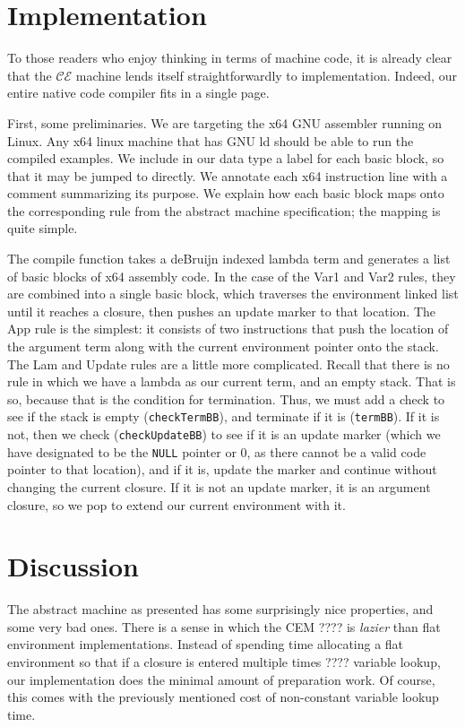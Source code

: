 \documentclass[preprint]{sigplanconf}
\begin{document}
\section{Implementation}\label{sec:impl}

To those readers who enjoy thinking in terms of machine code, it is
already clear that the $\mathcal{CE}$ machine lends itself
straightforwardly to implementation. Indeed, our
entire native code compiler fits in a single page. 

First, some preliminaries. We are targeting the x64 GNU
assembler running on Linux. Any x64 linux machine that has GNU ld should be able
to run the compiled examples.
We include in our
data type a label for each basic block, so that it may be jumped to directly.
We annotate each x64 instruction line with a comment summarizing its purpose. 
We explain how each basic block maps onto the corresponding rule from
the abstract machine specification; the mapping is
quite simple. 

The compile function takes a deBruijn indexed lambda term and
generates a list of basic blocks of x64 assembly code. In the case of the Var1
and Var2 rules, they are combined into a single basic block, which traverses the
environment linked list until it reaches a closure, then pushes an update marker
to that location. The App rule is the simplest: it consists of two instructions
that push the location of the argument term along with the current environment
pointer onto the stack. The Lam and Update rules are a little more complicated.
Recall that there is no rule in which we have a lambda as our current term, and
an empty stack. That is so, because that is the condition for termination. Thus, we
must add a check to see if the stack is empty (\texttt{checkTermBB}), and terminate if it
is (\texttt{termBB}). If it is not, then we check (\texttt{checkUpdateBB})
to see if it is an update marker (which
we have designated to be the \texttt{NULL} pointer or 0, as there cannot be a valid code
pointer to that location), and if it is,
update the marker and continue without changing the current closure. If it is
not an update marker, it is an argument closure, so we pop to extend our current
environment with it. 



\section{Discussion}
The abstract machine as presented has some surprisingly nice properties, and some
very bad ones. There is a sense in which the CEM ???? is \emph{lazier} than flat
environment implementations. Instead of spending time allocating a flat
environment so that if a closure is entered multiple times ???? variable lookup, our
implementation does the minimal amount of preparation work. Of course, this
comes with the previously mentioned cost of non-constant variable lookup time. 
\end{document}
